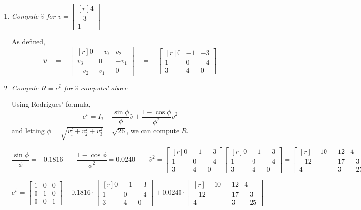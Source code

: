 \documentclass[10pt, oneside, letter]{article}
\begin{document}
	\begin{enumerate}[label=(\alph*)]
	
		\item \it Compute $\hat {v}$ for $v = \begin{bmatrix*}[r] 4 \\ -3 \\ 1
		\end{bmatrix*}$ \rm
	
			As defined, $$\boxed{\hat{v} \quad = \quad \begin{bmatrix*}[r]
			0 & -v_3 & v_2 \\ v_3 & 0 & -v_1 \\ -v_2 & v_1 & 0
			\end{bmatrix*} \quad = \quad
			\begin{bmatrix*}[r]
			0 & -1 & -3 \\ 1 & 0 & -4 \\ 3 & 4 & 0
			\end{bmatrix*}}$$
	
	
	
		\item \it Compute $R = e^{\hat{v}}$ for $\hat{v}$ computed above. \rm
	
			Using Rodrigues' formula, $$e^{\hat{v}} = I_3 + \dfrac{\sin \phi}{\phi} \hat{v} + \dfrac{1 - \cos\phi}{\phi^2} \hat{v}^2$$ and letting $\phi = \sqrt{v_1^2 + v_2^2 + v_3^2} = \sqrt{26}$, we can compute $R$.
			
			$$\dfrac{\sin\phi}{\phi} = -0.1816 \qquad \dfrac{1-\cos\phi}{\phi^2} = 0.0240 \qquad \hat{v}^2  = \begin{bmatrix*}[r]
			0 & -1 & -3 \\ 1 & 0 & -4 \\ 3 & 4 & 0
			\end{bmatrix*} 
			\begin{bmatrix*}[r]
			0 & -1 & -3 \\ 1 & 0 & -4 \\ 3 & 4 & 0
			\end{bmatrix*} = \begin{bmatrix*}[r]
			-10 & -12 & 4 \\ -12 & -17 & -3 \\ 4 & -3 & -25
			\end{bmatrix*}$$
			
			$$e^{\hat{v}} = \begin{bmatrix}
			1 & 0 & 0 \\ 0 & 1 & 0 \\ 0 & 0 & 1
			\end{bmatrix} - 0.1816\cdot
			\begin{bmatrix*}[r]
			0 & -1 & -3 \\ 1 & 0 & -4 \\ 3 & 4 & 0
			\end{bmatrix*} + 0.0240\cdot
			\begin{bmatrix*}[r]
			-10 & -12 & 4 \\ -12 & -17 & -3 \\ 4 & -3 & -25
			\end{bmatrix*}$$
			

\end{enumerate}
\end{document}
